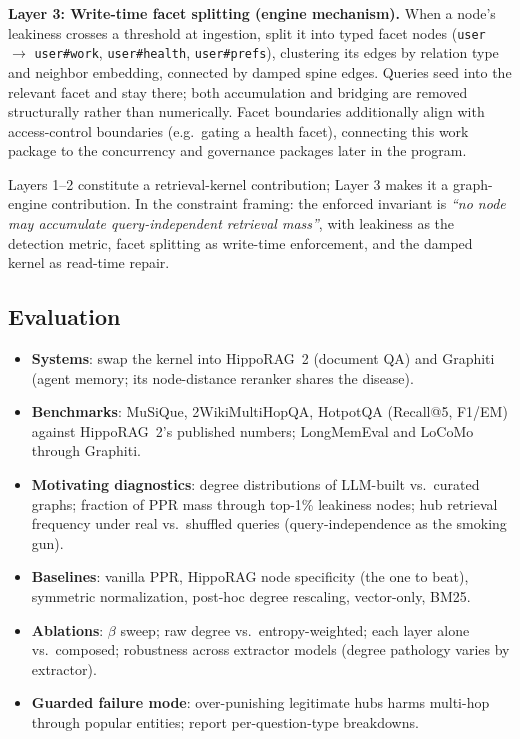 \documentclass[11pt,a4paper]{article}
\newcommand{\code}[1]{\texttt{#1}}
\begin{document}
\textbf{Layer 3: Write-time facet splitting (engine mechanism).} When a node's leakiness crosses a threshold at ingestion, split it into typed facet nodes (\code{user} $\rightarrow$ \code{user\#work}, \code{user\#health}, \code{user\#prefs}), clustering its edges by relation type and neighbor embedding, connected by damped spine edges. Queries seed into the relevant facet and stay there; both accumulation and bridging are removed structurally rather than numerically. Facet boundaries additionally align with access-control boundaries (e.g.\ gating a health facet), connecting this work package to the concurrency and governance packages later in the program.

Layers 1--2 constitute a retrieval-kernel contribution; Layer 3 makes it a graph-engine contribution. In the constraint framing: the enforced invariant is \emph{``no node may accumulate query-independent retrieval mass''}, with leakiness as the detection metric, facet splitting as write-time enforcement, and the damped kernel as read-time repair.

\subsection{Evaluation}

\begin{itemize}[nosep]
  \item \textbf{Systems}: swap the kernel into HippoRAG~2 (document QA) and Graphiti (agent memory; its node-distance reranker shares the disease).
  \item \textbf{Benchmarks}: MuSiQue, 2WikiMultiHopQA, HotpotQA (Recall@5, F1/EM) against HippoRAG~2's published numbers; LongMemEval and LoCoMo through Graphiti.
  \item \textbf{Motivating diagnostics}: degree distributions of LLM-built vs.\ curated graphs; fraction of PPR mass through top-1\% leakiness nodes; hub retrieval frequency under real vs.\ shuffled queries (query-independence as the smoking gun).
  \item \textbf{Baselines}: vanilla PPR, HippoRAG node specificity (the one to beat), symmetric normalization, post-hoc degree rescaling, vector-only, BM25.
  \item \textbf{Ablations}: $\beta$ sweep; raw degree vs.\ entropy-weighted; each layer alone vs.\ composed; robustness across extractor models (degree pathology varies by extractor).
  \item \textbf{Guarded failure mode}: over-punishing legitimate hubs harms multi-hop through popular entities; report per-question-type breakdowns.
\end{itemize}
\end{document}
